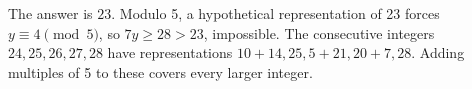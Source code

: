 The answer is $\boxed{23}$. Modulo 5, a hypothetical representation of 23 forces $y\equiv 4\pmod{5}$, so $7y\ge 28>23$, impossible. The consecutive integers $24,25,26,27,28$ have representations $10+14,25,5+21,20+7,28$. Adding multiples of 5 to these covers every larger integer.
